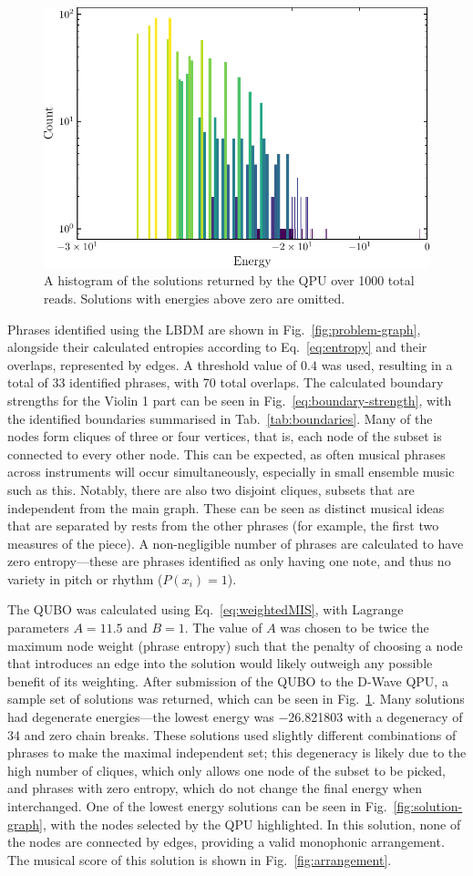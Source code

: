 \documentclass[aps,pra,12pt,onecolumn]{revtex4-2}
\begin{document}
\begin{figure}[h]
    \centering
    \includegraphics[width=0.5\linewidth]{../Figures/histogram.pdf}
    \caption{A histogram of the solutions returned by the QPU over 1000 total reads. Solutions with energies above zero are omitted.}
    \label{fig:histogram}
\end{figure}

Phrases identified using the LBDM are shown in Fig.\ \ref{fig:problem-graph}, alongside their calculated entropies according to Eq.\ \ref{eq:entropy} and their overlaps, represented by edges. A threshold value of $0.4$ was used, resulting in a total of 33 identified phrases, with 70 total overlaps. The calculated boundary strengths for the Violin 1 part can be seen in Fig.\ \ref{eq:boundary-strength}, with the identified boundaries summarised in Tab.\ \ref{tab:boundaries}. Many of the nodes form cliques of three or four vertices, that is, each node of the subset is connected to every other node. This can be expected, as often musical phrases across instruments will occur simultaneously, especially in small ensemble music such as this. Notably, there are also two disjoint cliques, subsets that are independent from the main graph. These can be seen as distinct musical ideas that are separated by rests from the other phrases (for example, the first two measures of the piece). A non-negligible number of phrases are calculated to have zero entropy—these are phrases identified as only having one note, and thus no variety in pitch or rhythm ($P(x_i)=1$).

The QUBO was calculated using Eq.\ \ref{eq:weightedMIS}, with Lagrange parameters $A=11.5$ and $B=1$. The value of $A$ was chosen to be twice the maximum node weight (phrase entropy) such that the penalty of choosing a node that introduces an edge into the solution would likely outweigh any possible benefit of its weighting. After submission of the QUBO to the D-Wave QPU, a sample set of solutions was returned, which can be seen in Fig.\ \ref{fig:histogram}. Many solutions had degenerate energies—the lowest energy was \num{-26.821803} with a degeneracy of 34 and zero chain breaks. These solutions used slightly different combinations of phrases to make the maximal independent set; this degeneracy is likely due to the high number of cliques, which only allows one node of the subset to be picked, and phrases with zero entropy, which do not change the final energy when interchanged. One of the lowest energy solutions can be seen in Fig.\ \ref{fig:solution-graph}, with the nodes selected by the QPU highlighted. In this solution, none of the nodes are connected by edges, providing a valid monophonic arrangement. The musical score of this solution is shown in Fig.\ \ref{fig:arrangement}.
\end{document}
